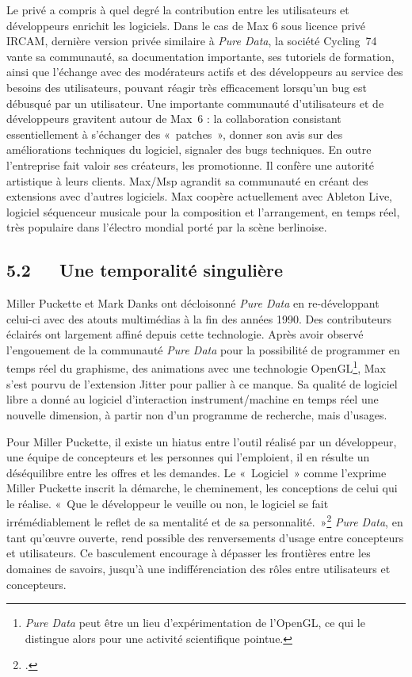 \documentclass{FramateX}
\begin{document}
\begin{refsection}
Le privé a compris à quel degré la contribution entre les utilisateurs
et développeurs enrichit les logiciels. Dans le cas de Max 6 sous
licence privé IRCAM, dernière version privée similaire à \textit{Pure Data}, la
société Cycling~74 vante sa communauté, sa documentation importante,
ses tutoriels de formation, ainsi que l'échange avec des modérateurs
actifs et des développeurs au service des besoins des utilisateurs,
pouvant réagir très efficacement lorsqu'un bug est débusqué par un
utilisateur. Une importante communauté d'utilisateurs
et de développeurs gravitent autour de Max~6 : la collaboration
consistant essentiellement à s'échanger des
«~patches~», donner son avis sur des améliorations techniques du
logiciel, signaler des bugs techniques. En outre l'entreprise fait
valoir ses créateurs, les promotionne. Il confère une autorité
artistique à leurs clients. Max/Msp agrandit sa communauté en créant
des extensions avec d'autres logiciels. Max coopère actuellement avec
Ableton Live, logiciel séquenceur musicale pour la composition et
l'arrangement, en temps réel, très populaire dans l'électro mondial
porté par la scène berlinoise.




\subsection*{5.2~~~Une temporalité singulière}
{}

Miller Puckette et Mark Danks ont décloisonné \textit{Pure Data} en re-développant
celui-ci avec des atouts multimédias à la fin des années 1990. Des
contributeurs éclairés ont largement affiné depuis cette technologie.
Après avoir observé l'engouement de la communauté \textit{Pure Data} pour la
possibilité de programmer en temps réel du graphisme, des animations
avec une technologie OpenGL\footnote{\textit{Pure Data} peut être un lieu
d'expérimentation de l'OpenGL, ce qui le distingue alors pour une
activité scientifique pointue.}, Max s'est pourvu de l'extension Jitter
pour pallier à ce manque. Sa qualité de logiciel libre a donné au
logiciel d'interaction instrument/machine en temps réel une nouvelle
dimension, à partir non d'un programme de recherche, mais d'usages. 

Pour Miller Puckette, il existe un hiatus entre l'outil réalisé par un
développeur, une équipe de concepteurs et les personnes qui
l'emploient, il en résulte un déséquilibre entre les offres et les
demandes. Le «~Logiciel~» comme l'exprime Miller Puckette inscrit la
démarche, le cheminement, les conceptions de celui qui le réalise.
«~Que le développeur le veuille ou non, le logiciel se fait
irrémédiablement le reflet de sa mentalité et de sa
personnalité.~»\footnote{\cite[p.~182]{Puckette2011}.} \textit{Pure Data}, en tant qu'œuvre ouverte, rend possible
des renversements d'usage entre concepteurs et utilisateurs. Ce
basculement encourage à dépasser les frontières entre les domaines de
savoirs, jusqu'à une indifférenciation des rôles entre utilisateurs et
concepteurs.



\end{refsection}
\end{document}
